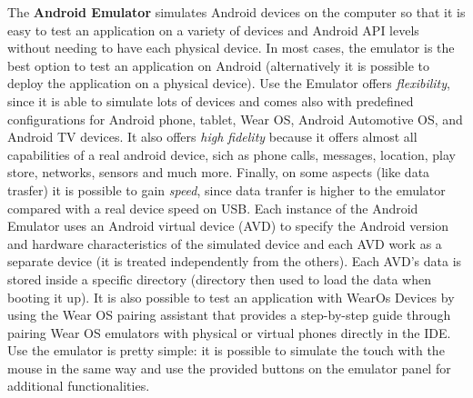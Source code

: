 \noindent The \textbf{Android Emulator} simulates Android devices on the computer so that it is easy to test an application on a variety of devices and Android API levels without needing to have each physical device. In most cases, the emulator is the best option to test an application on Android (alternatively it is possible to deploy the application on a physical device). Use the Emulator offers \textit{flexibility}, since it is able to simulate lots of devices and comes also with predefined configurations for Android phone, tablet, Wear OS, Android Automotive OS, and Android TV devices. It also offers \textit{high fidelity} because it offers almost all capabilities of a real android device, sich as phone calls, messages, location, play store, networks, sensors and much more. Finally, on some aspects (like data trasfer) it is possible to gain \textit{speed}, since data tranfer is higher to the emulator compared with a real device speed on USB. Each instance of the Android Emulator uses an Android virtual device (AVD) to specify the Android version and hardware characteristics of the simulated device and each AVD work as a separate device (it is treated independently from the others). Each AVD's data is stored inside a specific directory (directory then used to load the data when booting it up). It is also possible to test an application with WearOs Devices by using the Wear OS pairing assistant that provides a step-by-step guide through pairing Wear OS emulators with physical or virtual phones directly in the IDE. Use the emulator is pretty simple: it is possible to simulate the touch with the mouse in the same way and use the provided buttons on the emulator panel for additional functionalities\cite{AndroidStudioEmulatorFeature}.


